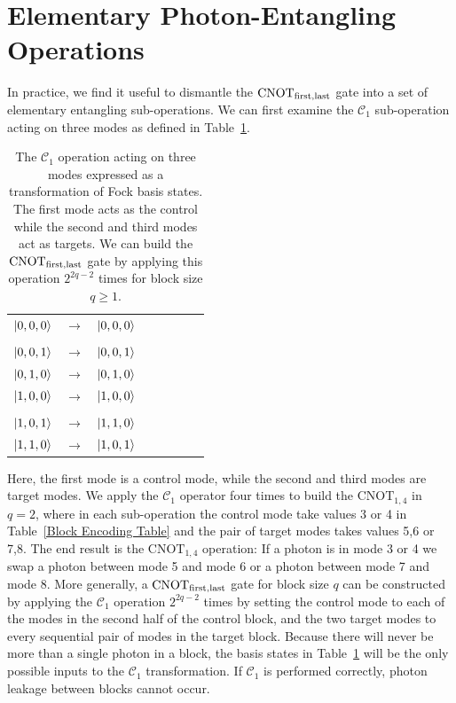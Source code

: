 \documentclass[aps,pra,twocolumn,showpacs,superscriptaddress,floatfix,10pt]{revtex4}
\begin{document}
\section{Elementary Photon-Entangling Operations}
\label{Section Elementary Photon Entangling Operations}

 In practice, we find it useful to dismantle the $\mbox{CNOT}_{\rm first,last}$ gate into a set of elementary entangling sub-operations. We can first examine the $\mathcal{C}_1$ sub-operation acting on three modes as defined in Table~\ref{One Control Two Targets}. 
\begin {table}[h]
\begin{center}
	\begin{tabular}{l*{6}{c}r} 
		$\ket{0,0,0}$  &  $\rightarrow$ & $\ket{0,0,0}$ \\ \\
		$\ket{0,0,1}$  & $\rightarrow$ & $\ket{0,0,1}$ \\
		$\ket{0,1,0}$ & $\rightarrow$ & $\ket{0,1,0}$ \\
		$\ket{1,0,0}$ & $\rightarrow$ & $\ket{1,0,0} $ \\ \\
		$\ket{1,0,1}$ & $\rightarrow$ & $\ket{1,1,0}$ \\
		$\ket{1,1,0}$ & $\rightarrow$ & $\ket{1,0,1}$ \\
	\end{tabular}
	\caption{ \label{One Control Two Targets} The $\mathcal{C}_1$  operation acting on three modes expressed as a transformation of Fock basis states. The first mode acts as the control while the second and third modes act as targets. We can build the $\mbox{CNOT}_{\rm first,last}$ gate by applying this operation $2^{2 q -2}$ times for block size $q \ge 1 $.}
\end{center}
\end{table}
Here, the first mode is a control mode, while the second and third modes are target modes. We apply the $\mathcal{C}_1$  operator four times to build the $\mbox{CNOT}_{1,4}$ in $q=2$, where in each sub-operation the control mode take values 3 or 4 in Table~\ref{Block Encoding Table} and the pair of target modes takes values 5,6 or 7,8. The end result is the $\mbox{CNOT}_{1,4}$ operation: If a photon is in mode 3 or 4 we swap a photon between mode 5 and mode 6 or a photon between mode 7 and mode 8. More generally, a $\mbox{CNOT}_{\rm first,last}$ gate for block size $q$ can be constructed by applying the $\mathcal{C}_1$  operation $2^{2q-2}$ times by setting the control mode to each of the modes in the second half of the control block, and the two target modes to every sequential pair of modes in the target block. Because there will never be more than a single photon in a block, the basis states in Table~\ref{One Control Two Targets} will be the only possible inputs to the $\mathcal{C}_1$  transformation. If $\mathcal{C}_1$ is performed correctly, photon leakage between blocks cannot occur.
\end{document}
